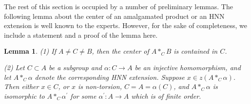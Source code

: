 \documentclass[11pt]{amsart}
\theoremstyle{plain}
\numberwithin{theorem}{section}
\newtheorem{lemma}[theorem]{Lemma}
\theoremstyle{definition}
\begin{document}
The rest of this section is occupied by a number of preliminary lemmas.
The following lemma about the center of an amalgamated product or an HNN extension 
is well known to the experts. However, for the sake of completeness, we include a statement and
a proof of the lemma here. 

\begin{lemma}
(1) If $A\neq C\neq B$, then the center of $A \ast_C B$ is contained in $C$. 

(2) Let $C\subset A$ be a subgroup and $\alpha:C\rightarrow A$ be an injective homomorphism, 
and let $A\ast_C\alpha$ denote the corresponding HNN extension. Suppose $x\in z(A\ast_C\alpha)$. 
Then either $x\in C$, or $x$ is non-torsion, $C=A=\alpha(C)$, and $A\ast_C\alpha$ is isomorphic to 
$A\ast_C\alpha^\prime$ for some $\alpha^\prime: A\rightarrow A$ which is of finite order.
\end{lemma}
\end{document}
